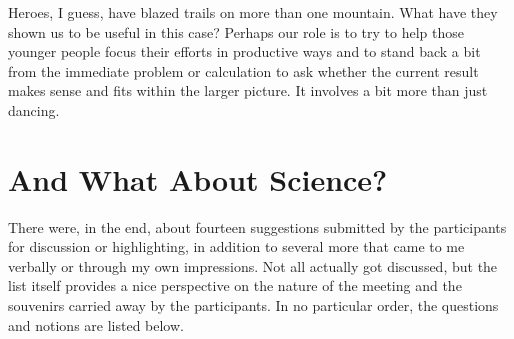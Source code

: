\documentclass[proceedings]{rmaa}
\begin{document}
        Heroes, I guess, have blazed trails on more than one mountain.  
What have they shown us to be useful in this case?  Perhaps our role is 
to try to help those younger people focus their efforts in productive 
ways and to stand back a bit from the immediate problem or calculation to 
ask whether the current result makes sense and fits within the larger 
picture.  It involves a bit more than just dancing.
\vspace*{-0.5ex}

\section{And What About Science?}
\vspace*{-0.5ex}
\enlargethispage{2ex}
        There were, in the end, about fourteen suggestions submitted by 
the participants for discussion or highlighting, in addition to several 
more that came to me verbally or through my own impressions.  Not all 
actually got discussed, but the list itself provides a nice perspective 
on the nature of the meeting and the souvenirs carried away by the 
participants.  In no particular order, the questions and notions are 
listed below.
\end{document}

